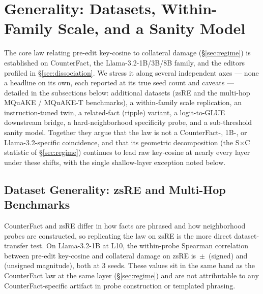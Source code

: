 \section{Generality: Datasets, Within-Family Scale, and a Sanity Model}
\label{sec:generality}

The core law relating pre-edit key-cosine to collateral damage
(\S\ref{sec:regime}) is established on CounterFact, the Llama-3.2-1B/3B/8B
family, and the editors profiled in \S\ref{sec:dissociation}. We stress it
along several independent axes --- none a headline on its own, each reported at
its true seed count and caveats --- detailed in the subsections below:
additional datasets (zsRE and the multi-hop MQuAKE / MQuAKE-T benchmarks), a
within-family scale replication, an instruction-tuned twin, a related-fact
(ripple) variant, a logit-to-GLUE downstream bridge, a hard-neighborhood
specificity probe, and a sub-threshold sanity model. Together they argue that
the law is not a CounterFact-, 1B-, or Llama-3.2-specific coincidence, and that
its geometric decomposition (the S$\times$C statistic of \S\ref{sec:regime})
continues to lead raw key-cosine at nearly every layer under these shifts, with
the single shallow-layer exception noted below.

\subsection{Dataset Generality: zsRE and Multi-Hop Benchmarks}
\label{sec:generality-zsre}
CounterFact and zsRE differ in how facts are phrased and how neighborhood
probes are constructed, so replicating the law on zsRE is the more direct
dataset-transfer test. On Llama-3.2-1B at L10, the within-probe Spearman
correlation between pre-edit key-cosine and collateral damage on zsRE is
\zsreSigned{}\,$\pm$\,\zsreSignedSD{} (signed) and \zsreMag{} (unsigned
magnitude), both at 3 seeds. These values sit in the same band as the
CounterFact law at the same layer (\S\ref{sec:regime}) and are not
attributable to any CounterFact-specific artifact in probe construction or
templated phrasing.

